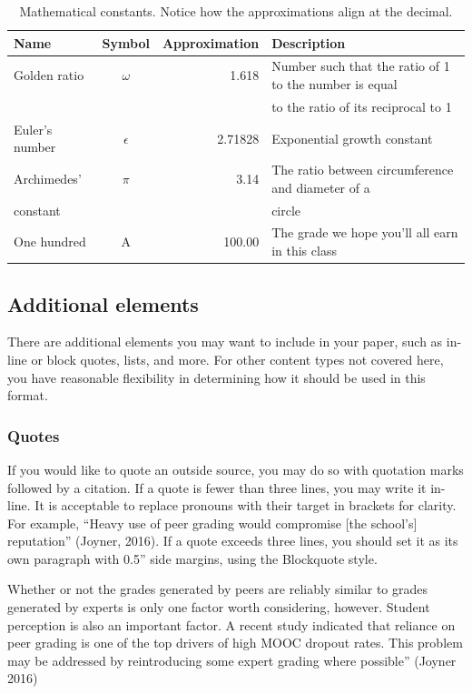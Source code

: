 {{{{\begin{table}[H]
  \centering
  \caption{Mathematical constants. Notice how the approximations align at the decimal.}
  \label{table:1}
  \begin{tabular}{@{}lcrl@{}}
    \textbf{Name} & \textbf{Symbol} & \textbf{Approximation} & \textbf{Description}\\
    \midrule
    Golden ratio & $\omega$ & 1.618 & Number such that the ratio of 1 to the number is equal\\
    & & & to the ratio of its reciprocal to 1\\
    \midrule
    Euler's number & $\epsilon$ & 2.71828 & Exponential growth constant\\
    \midrule
    Archimedes' & $\pi$ & 3.14 & The ratio between circumference and diameter of a\\
    constant & & & circle\\
    \midrule
    One hundred & A\super{+} & 100.00 & The grade we hope you'll all earn in this class
  \end{tabular}
\end{table}

\subsection{Additional elements}
There are additional elements you may want to include in your paper, such as in-line or block quotes, lists, and more. For other content types not covered here, you have reasonable flexibility in determining how it should be used in this format.

\subsubsection{Quotes}
If you would like to quote an outside source, you may do so with quotation marks followed by a citation. If a quote is fewer than three lines, you may write it in-line. It is acceptable to replace pronouns with their target in brackets for clarity. For example, “Heavy use of peer grading would compromise [the school’s] reputation” (Joyner, 2016). If a quote exceeds three lines, you should set it as its own paragraph with 0.5'' side margins, using the Blockquote style.

\begin{quoting}
Whether or not the grades generated by peers are reliably similar to grades
generated by experts is only one factor worth considering, however. Student
perception is also an important factor. A recent study indicated that reliance
on peer grading is one of the top drivers of high MOOC dropout rates. This
problem may be addressed by reintroducing some expert grading where possible''
(Joyner 2016)
\end{quoting}

}}}}
